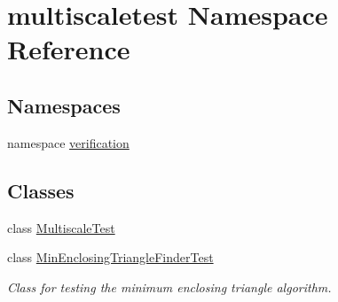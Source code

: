 \hypertarget{namespacemultiscaletest}{\section{multiscaletest Namespace Reference}
\label{namespacemultiscaletest}
}
\subsection*{Namespaces}
\begin{DoxyCompactItemize}
\item 
namespace \hyperlink{namespacemultiscaletest_1_1verification}{verification}
\end{DoxyCompactItemize}
\subsection*{Classes}
\begin{DoxyCompactItemize}
\item 
class \hyperlink{classmultiscaletest_1_1MultiscaleTest}{Multiscale\-Test}
\item 
class \hyperlink{classmultiscaletest_1_1MinEnclosingTriangleFinderTest}{Min\-Enclosing\-Triangle\-Finder\-Test}
\begin{DoxyCompactList}\small\item\em Class for testing the minimum enclosing triangle algorithm. \end{DoxyCompactList}\end{DoxyCompactItemize}
